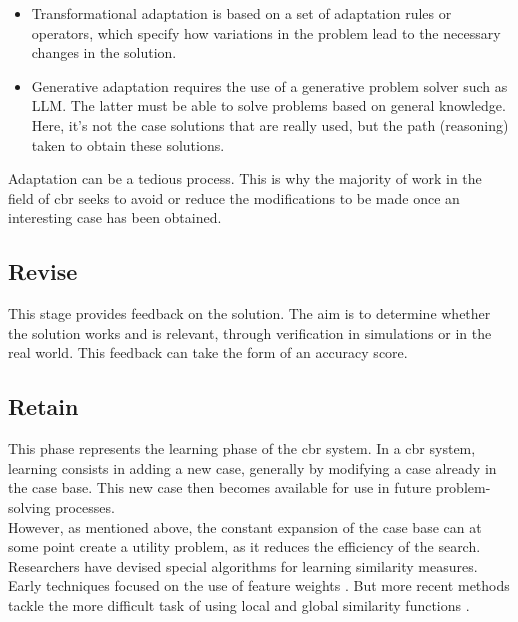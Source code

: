     \begin{itemize}
        \item Transformational adaptation is based on a set of adaptation rules or operators, which specify how variations in the problem lead to the necessary changes in the solution.  
        
        \item Generative adaptation requires the use of a generative problem solver such as LLM. The latter must be able to solve problems based on general knowledge. Here, it's not the case solutions that are really used, but the path (reasoning) taken to obtain these solutions. 
    \end{itemize}

    Adaptation can be a tedious process. This is why the majority of work in the field of \acrshort{cbr} seeks to avoid or reduce the modifications to be made once an interesting case has been obtained.


    \subsection{Revise}
    This stage provides feedback on the solution. The aim is to determine whether the solution works and is relevant, through verification in simulations or in the real world. This feedback can take the form of an accuracy score.
    
    
    \subsection{Retain}
    This phase represents the learning phase of the \acrshort{cbr} system. In a \acrshort{cbr} system, learning consists in adding a new case, generally by modifying a case already in the case base. This new case then becomes available for use in future problem-solving processes.\\
    However, as mentioned above, the constant expansion of the case base can at some point create a utility problem, as it reduces the efficiency of the search. Researchers have devised special algorithms for learning similarity measures. Early techniques focused on the use of feature weights \cite{cbrIntroRecent}. But more recent methods tackle the more difficult task of using local and global similarity functions \cite{shaheen2020novel, jaiswal2022f}. 

    
    

